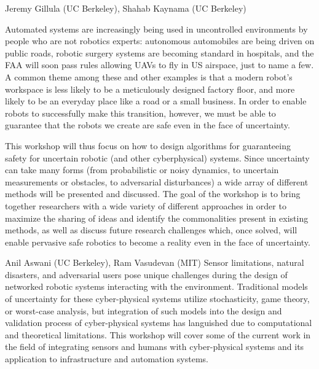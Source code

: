 \begin{spacing}{1.0}
{Jeremy Gillula (UC Berkeley), Shahab Kaynama (UC Berkeley)}
{
Automated systems are increasingly being used in uncontrolled environments by people who are not robotics experts: autonomous automobiles are being driven on public roads, robotic surgery systems are becoming standard in hospitals, and the FAA will soon pass rules allowing UAVs to fly in US airspace, just to name a few. A common theme among these and other examples is that a modern robot's workspace is less likely to be a meticulously designed factory floor, and more likely to be an everyday place like a road or a small business. In order to enable robots to successfully make this transition, however, we must be able to guarantee that the robots we create are safe even in the face of uncertainty.

This workshop will thus focus on how to design algorithms for guaranteeing safety for uncertain robotic (and other cyberphysical) systems. Since uncertainty can take many forms (from probabilistic or noisy dynamics, to uncertain measurements or obstacles, to adversarial disturbances) a wide array of different methods will be presented and discussed. The goal of the workshop is to bring together researchers with a wide variety of different approaches in order to maximize the sharing of ideas and identify the commonalities present in existing methods, as well as discuss future research challenges which, once solved, will enable pervasive safe robotics to become a reality even in the face of uncertainty.
}



{Anil Aswani (UC Berkeley), Ram Vasudevan (MIT)}
{
Sensor limitations, natural disasters, and adversarial users pose unique challenges during the design of networked robotic systems interacting with the environment. Traditional models of uncertainty for these cyber-physical systems utilize stochasticity, game theory, or worst-case analysis, but integration of such models into the design and validation process of cyber-physical systems has languished due to computational and theoretical limitations. This workshop will cover some of the current work in the field of integrating sensors and humans with cyber-physical systems and its application to infrastructure and automation systems.
}




\end{spacing}
